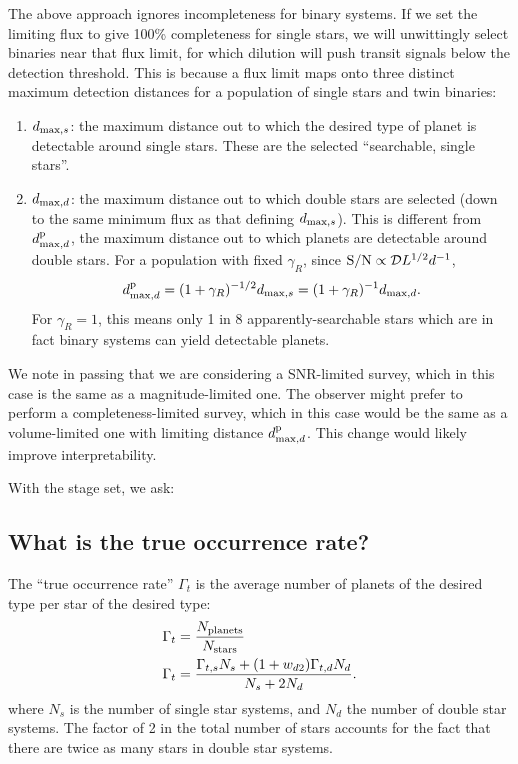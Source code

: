 \documentclass{emulateapj}
\begin{document}
The above approach ignores incompleteness for binary systems.
If we set the limiting flux to give 100\% completeness for single stars, we 
will unwittingly select binaries near that flux limit, for which dilution 
will push transit signals below the detection threshold.
This is because a flux limit maps onto three distinct maximum 
detection distances for a population of single stars and twin binaries:
\begin{enumerate}
\item $d_{{\rm max},s}$: the maximum distance out to which the desired type 
	of planet is detectable around single stars.
	These are the selected ``searchable, single stars''.
%
\item $d_{{\rm max},d}$: the maximum distance out to which double stars
  are selected (down to the same minimum flux as that defining $d_{{\rm 
  max},s}$). 
  This is different from $d_{{\rm max},d}^{\rm p}$, the maximum
  distance out to which planets are detectable around double stars. For a 
  population with fixed  $\gamma_R$, since ${\rm S/N} \propto \mathcal{D} 
  L^{1/2} d^{-1}$,
  \begin{equation}
    d_{{\rm max},d}^{\rm p} = (1 + \gamma_R)^{-1/2} d_{{\rm max},s} = 
    (1 + \gamma_R)^{-1} d_{{\rm max},d}.
  \end{equation}
  For $\gamma_R = 1$, this means only 1 in 8 apparently-searchable stars which 
  are in fact binary systems can yield detectable planets.
  
\end{enumerate}

We note in passing that we are considering a SNR-limited survey, which in this 
case is the same as a magnitude-limited one.
The observer might prefer to perform a completeness-limited survey, which in 
this case would be the same as a volume-limited one with limiting distance
$d_{{\rm max},d}^{\rm p}$.
This change would likely improve interpretability.

With the stage set, we ask:

\subsection{What is the true occurrence rate?}
\label{sec:true_rate}

The ``true occurrence rate'' $\Gamma_t$ is the average number of planets of 
the desired type per star of the desired type:
\begin{align}
\Gamma_t &= \frac{N_{\rm planets}}{N_{\rm stars}} \\
\Gamma_t &= \frac{\Gamma_{t,s} N_s + (1+w_{d2}) \Gamma_{t,d} N_d}{N_s + 2N_d}.
\label{eq:true_occ}
\end{align}
where $N_s$ is the number of single star systems, and $N_d$ the number of 
double star systems. 
The factor of 2 in the total number of stars accounts for the fact that there 
are twice as many stars in double star systems.
\end{document}
